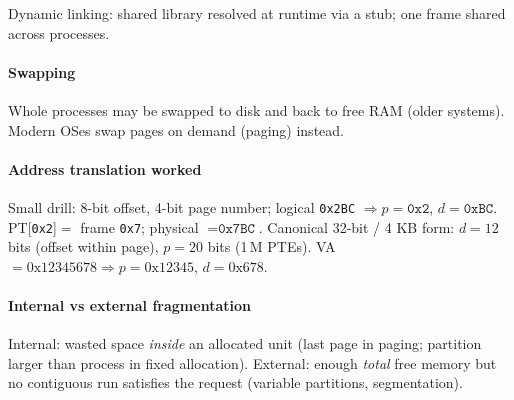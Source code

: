 \textcolor{Bittersweet}{Dynamic linking}: shared library resolved at runtime via a stub; one frame shared across processes.

\paragraph{Swapping}
Whole processes may be swapped to disk and back to free RAM (older systems). Modern OSes swap pages on demand (paging) instead.

\paragraph{Address translation worked}
Small drill: 8-bit offset, 4-bit page number; logical \texttt{0x2BC} $\Rightarrow p=\texttt{0x2}$, $d=\texttt{0xBC}$. PT[\texttt{0x2}]$=$ frame \texttt{0x7}; physical $=\texttt{0x7BC}$.
Canonical 32-bit / 4 KB form: $d=12$ bits (offset within page), $p=20$ bits (1\,M PTEs). VA $= 0\text{x}12345678 \Rightarrow p = 0\text{x}12345$, $d = 0\text{x}678$.

\paragraph{Internal vs external fragmentation}
\textcolor{Bittersweet}{Internal}: wasted space \emph{inside} an allocated unit (last page in paging; partition larger than process in fixed allocation).
\textcolor{Bittersweet}{External}: enough \emph{total} free memory but no contiguous run satisfies the request (variable partitions, segmentation).
